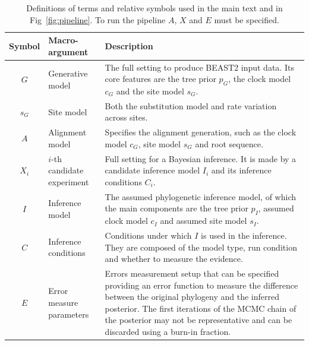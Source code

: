 \begin{table}
  \begin{tabular}{|@{}c|p{4cm}|p{12.2cm}|}
    \hline
    \centering
    \textbf{Symbol} &
    \textbf{Macro-argument} &
    \textbf{Description} \\
    \hline
    $\mathit{G}$ &
    Generative model &
    The full setting to produce BEAST2 input data. 
    Its core features are the tree prior $\mathit{p_{G}}$, the clock 
    model $\mathit{c_{G}}$ and the site model $\mathit{s_{G}}$. \\
    $\mathit{s_{G}}$ &
    Site model &
    Both the substitution model and rate variation across sites. \\
    $\mathit{A}$ &
    Alignment model &
    Specifies the alignment generation, such as the clock model 
    $\mathit{c_{G}}$, site model $\mathit{s_{G}}$ and root sequence. \\
    $\mathit{X_{i}}$ &
    $i$-th candidate experiment &
    Full setting for a Bayesian inference. It is made by a 
    candidate inference model $\mathit{I_{i}}$ and its 
    inference conditions $\mathit{C_{i}}$. \\
    $\mathit{I}$ &
    Inference model &
    The assumed phylogenetic inference model, of which the main components
    are the tree prior $\mathit{p_{I}}$, assumed clock model $\mathit{c_{I}}$ 
    and assumed site model $\mathit{s_{I}}$. \\
    $\mathit{C}$ & Inference conditions & Conditions under which $\mathit{I}$ 
    is used in the inference. 
    They are composed of the model type, run condition and 
    whether to measure the evidence. \\
    $\mathit{E}$ & Error measure parameters & 
    Errors measurement setup that can be specified providing an 
    error function to measure the difference between the original phylogeny 
    and the inferred posterior. The first iterations of the MCMC chain of the 
    posterior may not be representative and can be discarded using a burn-in 
    fraction. \\
    \hline 
  \end{tabular}
  \caption{
    Definitions of terms and relative symbols used in the main text and in 
    Fig~\ref{fig:pipeline}. To run the pipeline $\mathit{A}$, $\mathit{X}$ 
    and $\mathit{E}$ must be specified.
  }
  \label{tab:definitions}
\end{table}

